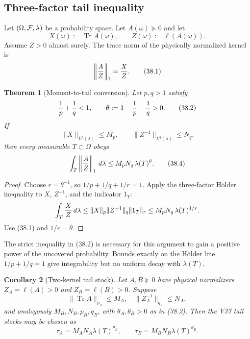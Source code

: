 \documentclass[11pt]{article}
\newtheorem{theorem}{Theorem}[section]
\newtheorem{corollary}[theorem]{Corollary}
\theoremstyle{remark}
\begin{document}
\subsection{Three-factor tail inequality}

Let \((\Omega,{\cal F},\lambda)\) be a probability space.  Let
\(A(\omega)\succeq0\) and let
\[
 X(\omega):=\operatorname{Tr}A(\omega),\qquad
 Z(\omega):=\ell(A(\omega)).
\]
Assume \(Z>0\) almost surely.  The trace norm of the physically
normalized kernel is
\begin{equation}
 \left\|{A\over Z}\right\|_1={X\over Z}.          \tag{38.1}
\end{equation}

\begin{theorem}[Moment-to-tail conversion]
\label{thm:v12v38-moment-tail}
Let \(p,q>1\) satisfy
\begin{equation}
                         {1\over p}+{1\over q}<1,
 \qquad
 \theta:=1-{1\over p}-{1\over q}>0.              \tag{38.2}
\end{equation}
If
\begin{equation}
 \|X\|_{L^p(\lambda)}\leq M_p,\qquad
 \|Z^{-1}\|_{L^q(\lambda)}\leq N_q,              \tag{38.3}
\end{equation}
then every measurable \(T\subset\Omega\) obeys
\begin{equation}
 \int_T\left\|{A\over Z}\right\|_1\,d\lambda
 \leq
 M_pN_q\,\lambda(T)^\theta.                      \tag{38.4}
\end{equation}
\end{theorem}

\begin{proof}
Choose \(r=\theta^{-1}\), so
\(1/p+1/q+1/r=1\).  Apply the three-factor H\"older inequality to
\(X\), \(Z^{-1}\), and the indicator \(1_T\):
\[
 \int_T{X\over Z}\,d\lambda
 \leq
 \|X\|_p\|Z^{-1}\|_q\|1_T\|_r
 \leq
 M_pN_q\,\lambda(T)^{1/r}.
\]
Use (38.1) and \(1/r=\theta\).
\end{proof}

The strict inequality in (38.2) is necessary for this argument to
gain a positive power of the uncovered probability.  Bounds exactly
on the H\"older line \(1/p+1/q=1\) give integrability but no uniform
decay with \(\lambda(T)\).

\begin{corollary}[Two-kernel tail stock]
\label{cor:v12v38-two-kernel}
Let \(A,B\succeq0\) have physical normalizers
\(Z_A=\ell(A)>0\) and \(Z_B=\ell(B)>0\).  Suppose
\[
 \|\operatorname{Tr}A\|_{p_A}\leq M_A,\quad
 \|Z_A^{-1}\|_{q_A}\leq N_A,
\]
and analogously \(M_B,N_B,p_B,q_B\), with
\(\theta_A,\theta_B>0\) as in (38.2).  Then the V37 tail stocks may
be chosen as
\begin{equation}
 \tau_A=M_AN_A\lambda(T)^{\theta_A},\qquad
 \tau_B=M_BN_B\lambda(T)^{\theta_B}.              \tag{38.5}
\end{equation}
\end{corollary}
\end{document}
